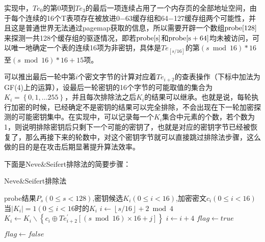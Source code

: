 实现中，$T{e_0}$的第0项到$T{e_3}$的最后一项连续占用了一个内存页的全部地址空间，由于每个连续的16个T表项存在被放进0$-$63缓存组和64$-$127缓存组两个可能性，并且这是普通世界无法通过pagemap获取的信息，所以需要开辟一个数组${\rm{probe[128]}}$来探测一共128个缓存组的驱逐情况，即若${\rm{probe[s]}}$和${\rm{probe[s+64]}}$均未被访问，可以唯一地确定一个表的连续16项为非密钥，具体是$T{e_{\left[ {s/16} \right]}}$的第$\left( {s\bmod 16} \right)*16$至$\left( {s\bmod 16} \right)*16 + 15$项。

可以推出最后一轮中第$i$个密文字节的计算对应着$T{e_{i + 2}}$的查表操作（下标中加法为 GF(4)上的运算），设最后一轮密钥的16个字节的可能取值的集合为${K_i} = \left\{ {0,1,...255} \right\}$，并且每次排除法之后${K_i}$的结果可以继承。也就是说，每轮执行加密的时候，已经确定不是密钥的结果可以完全排除，不会出现在下一轮加密探测的可能密钥集中。在实现中，可以记录每一个${K_i}$集合中元素的个数，若个数为1，则说明排除密钥后只剩下一个可能的密钥了，也就是对应的密钥字节已经被恢复了，那么再接下来的轮数中，对这个密钥字节就可以直接跳过排除法步骤，这么做的目的是在攻击后期显著提升算法效率。

下面是Neve\&Seifert排除法的简要步骤：

\begin{breakablealgorithm}
	\caption{Neve\&Seifert排除法}
	\begin{algorithmic}[1]
		\Require probe结果${P_s}(0 \le s < 128)$,密钥候选${K_i}\left( {0 \le i < 16} \right)$,加密密文${c_i}\left( {0 \le i < 16} \right)$
		\Ensure 当$\left| {{K_i}} \right| = 1\left( {0 \le i < 16}$时的${K_i}$
				\State $i\gets \left\lfloor {s/16} \right\rfloor  + 2\bmod 4$
						\State $K_i\gets {K_i}\backslash \left\{ {{c_i} \oplus Te_{i + 2}^{'}\left[ {\left( {s\bmod 16} \right) \times 16 + j} \right]} \right\}$
					\EndFor
					\State $i\gets i+4$
				\EndWhile
			\EndIf
		\EndFor
		\State $flag\gets true$
		
				\State $flag\gets false$
			\EndIf
		\EndFor
		\State{}
		\EndFunction
	\end{algorithmic}
\end{breakablealgorithm}





